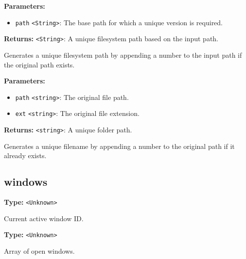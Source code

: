 \documentclass[12pt,a4paper]{article}
\begin{document}
\noindent \textbf{Parameters:}
\begin{itemize}
  \item \texttt{path} \texttt{<String>}: The base path for which a unique version is required.
\end{itemize}

\noindent \textbf{Returns:} \texttt{<String>}: A unique filesystem path based on the input path.

\noindent Generates a unique filesystem path by appending a number to the input path if the original path exists.

\vspace{5mm}
\noindent {}


\noindent \textbf{Parameters:}
\begin{itemize}
  \item \texttt{path} \texttt{<string>}: The original file path.
  \item \texttt{ext} \texttt{<string>}: The original file extension.
\end{itemize}

\noindent \textbf{Returns:} \texttt{<string>}: A unique folder path.

\noindent Generates a unique filename by appending a number to the original path if it already exists.


\subsection{windows}
\vspace{5mm}
\noindent {}\vspace{4mm}


\noindent \textbf{Type:} \texttt{<Unknown>}

\noindent Current active window ID.

\vspace{5mm}
\noindent {}\vspace{4mm}


\noindent \textbf{Type:} \texttt{<Unknown>}

\noindent Array of open windows.

\vspace{5mm}
\noindent {}
\end{document}
